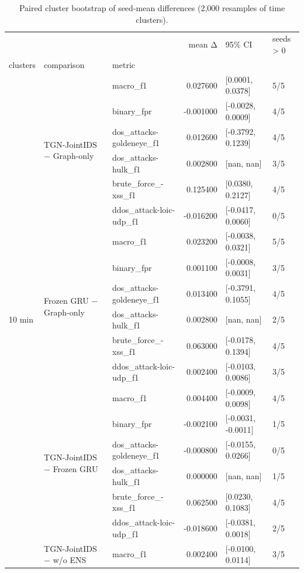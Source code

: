 \begin{table}
\caption{Paired cluster bootstrap of seed-mean differences (2,000 resamples of time clusters).}
\label{tab:table8_paired}
\begin{tabular}{lllrll}
\toprule
 &  &  & mean Δ & 95\% CI & seeds > 0 \\
clusters & comparison & metric &  &  &  \\
\midrule
\multirow[t]{24}{*}{10 min} & \multirow[t]{6}{*}{TGN-JointIDS − Graph-only} & macro\_f1 & 0.027600 & [0.0001, 0.0378] & 5/5 \\
 &  & binary\_fpr & -0.001000 & [-0.0028, 0.0009] & 4/5 \\
 &  & dos\_attacks-goldeneye\_f1 & 0.012600 & [-0.3792, 0.1239] & 4/5 \\
 &  & dos\_attacks-hulk\_f1 & 0.002800 & [nan, nan] & 3/5 \\
 &  & brute\_force\_-xss\_f1 & 0.125400 & [0.0380, 0.2127] & 4/5 \\
 &  & ddos\_attack-loic-udp\_f1 & -0.016200 & [-0.0417, 0.0060] & 0/5 \\
\cline{2-6}
 & \multirow[t]{6}{*}{Frozen GRU − Graph-only} & macro\_f1 & 0.023200 & [-0.0038, 0.0321] & 5/5 \\
 &  & binary\_fpr & 0.001100 & [-0.0008, 0.0031] & 3/5 \\
 &  & dos\_attacks-goldeneye\_f1 & 0.013400 & [-0.3791, 0.1055] & 4/5 \\
 &  & dos\_attacks-hulk\_f1 & 0.002800 & [nan, nan] & 2/5 \\
 &  & brute\_force\_-xss\_f1 & 0.063000 & [-0.0178, 0.1394] & 4/5 \\
 &  & ddos\_attack-loic-udp\_f1 & 0.002400 & [-0.0103, 0.0086] & 3/5 \\
\cline{2-6}
 & \multirow[t]{6}{*}{TGN-JointIDS − Frozen GRU} & macro\_f1 & 0.004400 & [-0.0009, 0.0098] & 4/5 \\
 &  & binary\_fpr & -0.002100 & [-0.0031, -0.0011] & 1/5 \\
 &  & dos\_attacks-goldeneye\_f1 & -0.000800 & [-0.0155, 0.0266] & 0/5 \\
 &  & dos\_attacks-hulk\_f1 & 0.000000 & [nan, nan] & 1/5 \\
 &  & brute\_force\_-xss\_f1 & 0.062500 & [0.0230, 0.1083] & 4/5 \\
 &  & ddos\_attack-loic-udp\_f1 & -0.018600 & [-0.0381, 0.0018] & 2/5 \\
\cline{2-6}
 & \multirow[t]{6}{*}{TGN-JointIDS − w/o ENS} & macro\_f1 & 0.002400 & [-0.0100, 0.0114] & 3/5 \\

\end{tabular}
\end{table}
